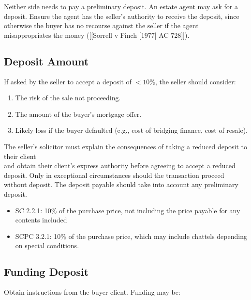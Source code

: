 \documentclass[
]{article}
\providecommand{\tightlist}{%
  \setlength{\itemsep}{0pt}\setlength{\parskip}{0pt}}
\begin{document}
Neither side needs to pay a preliminary deposit. An estate agent may ask
for a deposit. Ensure the agent has the seller's authority to receive
the deposit, since otherwise the buyer has no recourse against the
seller if the agent misappropriates the money ({[}{[}Sorrell v Finch
{[}1977{]} AC 728{]}{]}).

\hypertarget{deposit-amount}{%
\subsection{Deposit Amount}\label{deposit-amount}}

If asked by the seller to accept a deposit of \(<10\%\), the seller
should consider:

\begin{enumerate}
\def\labelenumi{\arabic{enumi}.}
\tightlist
\item
  The risk of the sale not proceeding.
\item
  The amount of the buyer's mortgage offer.
\item
  Likely loss if the buyer defaulted (e.g., cost of bridging finance,
  cost of resale).
\end{enumerate}

The seller's solicitor must explain the consequences of taking a reduced
deposit to their client\\
and obtain their client's express authority before agreeing to accept a
reduced deposit. Only in exceptional circumstances should the
transaction proceed without deposit. The deposit payable should take
into account any preliminary deposit.

\begin{itemize}
\tightlist
\item
  SC 2.2.1: 10\% of the purchase price, not including the price payable
  for any contents included
\item
  SCPC 3.2.1: 10\% of the purchase price, which may include chattels
  depending on special conditions.
\end{itemize}

\hypertarget{funding-deposit}{%
\subsection{Funding Deposit}\label{funding-deposit}}

Obtain instructions from the buyer client. Funding may be:
\end{document}
